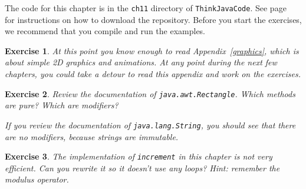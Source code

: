 \documentclass[12pt]{book}
\theoremstyle{exercise}
\newtheorem{exercise}{Exercise}[chapter]
\newcommand{\java}[1]{\verb"#1"}
\begin{document}
The code for this chapter is in the {\tt ch11} directory of {\tt ThinkJavaCode}.
See page~\pageref{code} for instructions on how to download the repository.
Before you start the exercises, we recommend that you compile and run the examples.


\begin{exercise}


At this point you know enough to read Appendix~\ref{graphics}, which is about simple 2D graphics and animations.
At any point during the next few chapters, you could take a detour to read this appendix and work on the exercises.

\end{exercise}


\begin{exercise}

Review the documentation of \java{java.awt.Rectangle}.
Which methods are pure?
Which are modifiers?

If you review the documentation of \java{java.lang.String}, you should see that there are no modifiers, because strings are immutable.

\end{exercise}


\begin{exercise}

The implementation of \java{increment} in this chapter is not very efficient.
Can you rewrite it so it doesn't use any loops?
Hint: remember the modulus operator.
\end{exercise}
\end{document}
